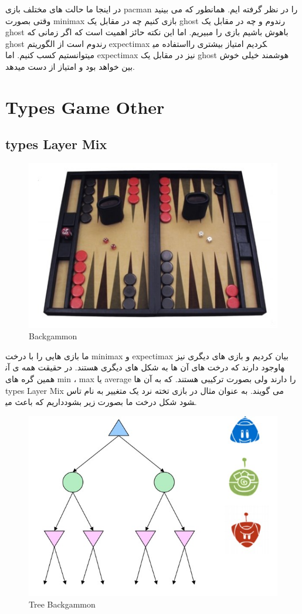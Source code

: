 در اینجا ما حالت های مختلف بازی pacman را در نظر گرفته ایم. همانطور که می بینید وقتی بصورت minimax بازی کنیم چه در مقابل یک ghost رندوم و چه در مقابل یک ghost باهوش باشیم بازی را مبیریم. اما این نکته حائز اهمیت است که اگر زمانی که ghost رندوم است از الگوریتم expectimax استفاده می‎کردیم امتیاز بیشتری را میتوانستیم کسب کنیم. اما expectimax نیز در مقابل یک ghost هوشمند خیلی خوش بین خواهد بود و امتیاز از دست میدهد.

\section{Types Game Other}

\subsection{types Layer Mix}

\begin{figure}[h!]
    \centering
    \includegraphics[width=0.6\linewidth]{images/backgammon.jpg}
    \caption{Backgammon}
\end{figure}

ما بازی هایی را با درخت minimax و expectimax بیان کردیم و بازی های دیگری نیز وجود دارند که درخت های آن ها به شکل های دیگری هستند. در حقیقت همه ی آن‎ها همین گره های  min ،  max یا average را دارند ولی بصورت ترکیبی هستند. که به آن ها types Layer Mix  می گویند. به عنوان مثال در بازی تخته نرد یک متغییر به نام تاس داریم که باعث می‎شود شکل درخت ما بصورت زیر بشود.

\begin{figure}[h!]
    \centering
    \includegraphics[width=0.6\linewidth]{images/backgammonTree.jpg}
    \caption{Tree Backgammon}
\end{figure}


